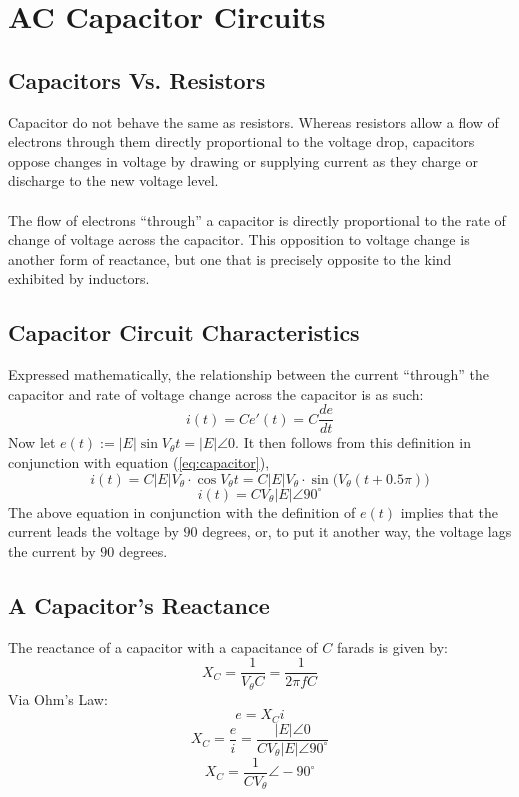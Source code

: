 \documentclass{article}
\begin{document}
	\section[Capacitor]{AC Capacitor Circuits}
	\subsection[CapvRes]{Capacitors Vs. Resistors}
	
	Capacitor do not behave the same as resistors. Whereas resistors allow 
		a 
	flow of electrons through them directly proportional to the voltage drop, 
	capacitors oppose changes in voltage by drawing or supplying current as 
	they charge or discharge to the new voltage level. \\ \\
	The flow of electrons “through” a capacitor is directly proportional to the 
	rate of change of voltage across the capacitor. This opposition to voltage 
	change is another form of reactance, but one that is precisely opposite to 
	the kind exhibited by inductors.
	\subsection[Equation]{Capacitor Circuit Characteristics}
	Expressed mathematically, the relationship between the current “through” 
	the capacitor and rate of voltage change across the capacitor is as such:
	\begin{equation}\label{eq:capacitor}
		i(t) = C e'(t) = C\frac{de}{dt}
	\end{equation}
	Now let $e(t):=|E|\sin V_\theta t = |E|\angle0$.  It then follows from this 
	definition in conjunction with equation (\ref{eq:capacitor}),
	$$ i(t) = C|E|V_\theta \cdot \cos V_\theta t = C|E|V_\theta \cdot \sin 
	\big(V_\theta(t + 0.5\pi)\big)$$
	$$ i(t) = CV_\theta|E|\angle90^{\circ}$$
	The above equation in conjunction with the definition of $e(t)$ implies 
	that the current leads the voltage by $90$ degrees, or, to put it another 
	way, the voltage lags the current by $90$ degrees.
	\subsection[Reactance]{A Capacitor's Reactance}
	The reactance of a capacitor with a capacitance of $C$ farads is given by:
	\begin{equation}\label{eq:reactance}
		X_C=\frac{1}{V_\theta C} = \frac{1}{2\pi f C}
	\end{equation}
	Via Ohm's Law:
	$$ e = X_C i$$
	$$ X_C = \frac{e}{i} = \frac{|E|\angle0}{CV_\theta|E|\angle90^{\circ}}$$
	$$ X_C = \frac{1}{CV_\theta} \angle-90^{\circ}$$
\end{document}
